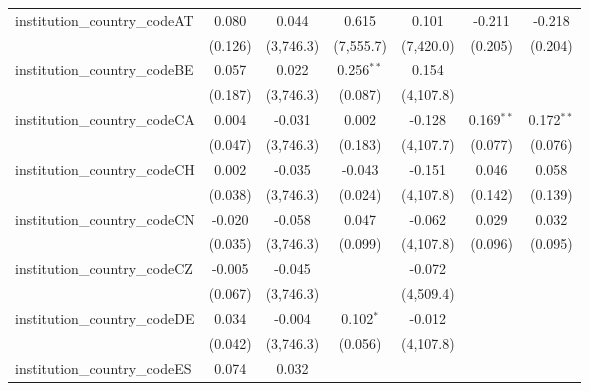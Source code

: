 \begin{tabular}{lcccccc}
   institution\_country\_codeAT          & 0.080          & 0.044         & 0.615         & 0.101         & -0.211         & -0.218\\   
                                         & (0.126)        & (3,746.3)     & (7,555.7)     & (7,420.0)     & (0.205)        & (0.204)\\   
   institution\_country\_codeBE          & 0.057          & 0.022         & 0.256$^{**}$  & 0.154         &                &   \\   
                                         & (0.187)        & (3,746.3)     & (0.087)       & (4,107.8)     &                &   \\   
   institution\_country\_codeCA          & 0.004          & -0.031        & 0.002         & -0.128        & 0.169$^{**}$   & 0.172$^{**}$\\   
                                         & (0.047)        & (3,746.3)     & (0.183)       & (4,107.7)     & (0.077)        & (0.076)\\   
   institution\_country\_codeCH          & 0.002          & -0.035        & -0.043        & -0.151        & 0.046          & 0.058\\   
                                         & (0.038)        & (3,746.3)     & (0.024)       & (4,107.8)     & (0.142)        & (0.139)\\   
   institution\_country\_codeCN          & -0.020         & -0.058        & 0.047         & -0.062        & 0.029          & 0.032\\   
                                         & (0.035)        & (3,746.3)     & (0.099)       & (4,107.8)     & (0.096)        & (0.095)\\   
   institution\_country\_codeCZ          & -0.005         & -0.045        &               & -0.072        &                &   \\   
                                         & (0.067)        & (3,746.3)     &               & (4,509.4)     &                &   \\   
   institution\_country\_codeDE          & 0.034          & -0.004        & 0.102$^{*}$   & -0.012        &                &   \\   
                                         & (0.042)        & (3,746.3)     & (0.056)       & (4,107.8)     &                &   \\   
   institution\_country\_codeES          & 0.074          & 0.032         &               &               &                &   \\   

\end{tabular}
